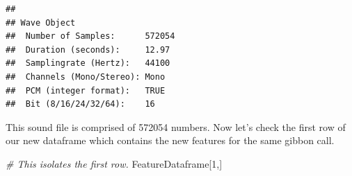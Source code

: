 \documentclass[]{book}
\newenvironment{Shaded}{\begin{snugshade}}{\end{snugshade}}
\newcommand{\CommentTok}[1]{\textcolor[rgb]{0.56,0.35,0.01}{\textit{#1}}}
\newcommand{\DecValTok}[1]{\textcolor[rgb]{0.00,0.00,0.81}{#1}}
\newcommand{\NormalTok}[1]{#1}
\begin{document}
\begin{verbatim}
## 
## Wave Object
##  Number of Samples:      572054
##  Duration (seconds):     12.97
##  Samplingrate (Hertz):   44100
##  Channels (Mono/Stereo): Mono
##  PCM (integer format):   TRUE
##  Bit (8/16/24/32/64):    16
\end{verbatim}

This sound file is comprised of 572054 numbers. Now let's check the first row of our new dataframe which contains the new features for the same gibbon call.

\begin{Shaded}
\begin{Highlighting}[]
\CommentTok{# This isolates the first row.}
\NormalTok{FeatureDataframe[}\DecValTok{1}\NormalTok{,] }
\end{Highlighting}
\end{Shaded}
\end{document}
